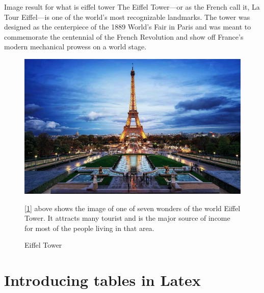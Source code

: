 \documentclass[12pt]{article}
\begin{document}
\begin{large}
Image result for what is eiffel tower
The Eiffel Tower—or as the French call it, La Tour Eiffel—is one of the world's most recognizable landmarks. The tower was designed as the centerpiece of the 1889 World's Fair in Paris and was meant to commemorate the centennial of the French Revolution and show off France's modern mechanical prowess on a world stage.\\
\begin{figure}[h]
\includegraphics[scale=0.23]{EiffelTower.jpg}
\caption{Eiffel Tower}
\label{fig : Tower}
[\ref{fig : Tower}] above shows the image of one of seven wonders of the world Eiffel Tower. It attracts many tourist and is the major source of income for most of the people living in that area.
\end{figure}

\section{Introducing tables in Latex}

\end{large}
\end{document}
